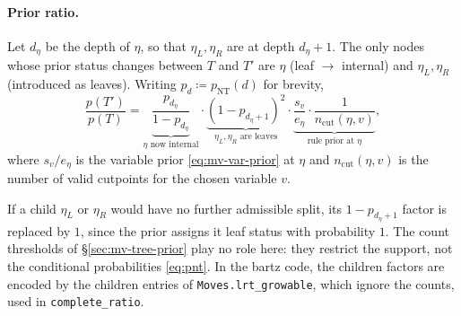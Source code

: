 \paragraph{Prior ratio.}
Let $d_\eta$ be the depth of $\eta$, so that $\eta_L, \eta_R$ are at depth
$d_\eta + 1$. The only nodes whose prior status changes between $T$ and
$T'$ are $\eta$ (leaf $\to$ internal) and $\eta_L, \eta_R$ (introduced as
leaves). Writing $p_d \coloneqq p_{\mathrm{NT}}(d)$ for brevity,
\begin{equation}
	\label{eq:mv-prior-ratio-grow}
	\frac{p(T')}{p(T)}
	= \underbrace{\frac{p_{d_\eta}}{1 - p_{d_\eta}}}_{\eta \text{ now internal}}
	\cdot \underbrace{(1 - p_{d_\eta + 1})^{2}}_{\eta_L,\eta_R \text{ are leaves}}
	\cdot \underbrace{\frac{s_v}{e_\eta} \cdot \frac{1}{n_{\mathrm{cut}}(\eta, v)}}_{\text{rule prior at } \eta},
\end{equation}
where $s_v / e_\eta$ is the variable prior \eqref{eq:mv-var-prior} at
$\eta$ and $n_{\mathrm{cut}}(\eta, v)$ is the number of valid cutpoints for
the chosen variable $v$.

If a child $\eta_L$ or $\eta_R$ would have no further admissible split, its
$1 - p_{d_\eta+1}$ factor is replaced by $1$, since the prior assigns it
leaf status with probability $1$. The count thresholds of
\S\ref{sec:mv-tree-prior} play no role here: they restrict the support, not
the conditional probabilities \eqref{eq:pnt}. In the bartz code, the
children factors are encoded by the children entries of
\texttt{Moves.lrt\_growable}, which ignore the counts, used in
\texttt{complete\_ratio}.

